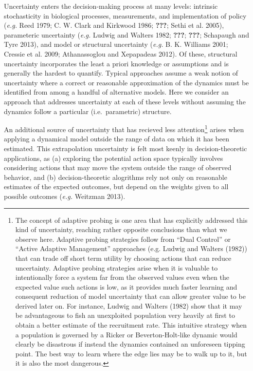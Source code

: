 \documentclass[author-year, review]{elsarticle} %
\begin{document}
Uncertainty enters the decision-making process at many levels: intrinsic
stochasticity in biological processes, measurements, and implementation
of policy (\emph{e.g.} Reed 1979; C. W. Clark and Kirkwood 1986;
{\textbf{???}}; Sethi et al. 2005), parameteric uncertainty (\emph{e.g.}
Ludwig and Walters 1982; {\textbf{???}}; {\textbf{???}}; Schapaugh and
Tyre 2013), and model or structural uncertainty (\emph{e.g.} B. K.
Williams 2001; Cressie et al. 2009; Athanassoglou and Xepapadeas 2012).
Of these, structural uncertainty incorporates the least a priori
knowledge or assumptions and is generally the hardest to quantify.
Typical approaches assume a weak notion of uncertainty where a correct
or reasonable approximation of the dynamics must be identified from
among a handful of alternative models. Here we consider an approach that
addresses uncertainty at each of these levels without assuming the
dynamics follow a particular (i.e.~parametric) structure.

An additional source of uncertainty that has recieved less
attention\footnote{The concept of adaptive probing is one area that has
  explicitly addressed this kind of uncertainty, reaching rather
  opposite conclusions than what we observe here. Adaptive probing
  strategies follow from ``Dual Control'' or ``Active Adaptive
  Management'' approaches (e.g. Ludwig and Walters (1982)) that can
  trade off short term utility by choosing actions that can reduce
  uncertainty. Adaptive probing strategies arise when it is valuable to
  intentionally force a system far from the observed values even when
  the expected value such actions is low, as it provides much faster
  learning and consequent reduction of model uncertainty that can allow
  greater value to be derived later on. For instance, Ludwig and Walters
  (1982) show that it may be advantageous to fish an unexploited
  population very heavily at first to obtain a better estimate of the
  recruitment rate. This intuitive strategy when a population is
  governed by a Ricker or Beverton-Holt-like dynamic would clearly be
  disastrous if instead the dynamics contained an unforeseen tipping
  point. The best way to learn where the edge lies may be to walk up to
  it, but it is also the most dangerous.} arises when applying a
dynamical model outside the range of data on which it has been
estimated. This extrapolation uncertainty is felt most keenly in
decision-theoretic applications, as (a) exploring the potential action
space typically involves considering actions that may move the system
outside the range of observed behavior, and (b) decision-theoretic
alogrithms rely not only on reasonable estimates of the expected
outcomes, but depend on the weights given to all possible outcomes
(\emph{e.g.} Weitzman 2013).
\end{document}
